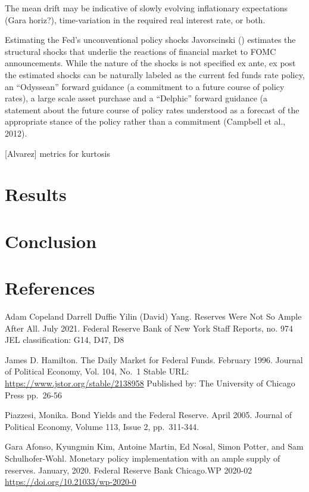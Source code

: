 \documentclass[
]{article}
\begin{document}
The mean drift may be indicative of slowly evolving inflationary expectations (Gara horiz?), time-variation in the required real interest rate, or both.

Estimating the Fed's unconventional policy shocks Javorscinski () estimates the structural shocks that underlie the reactions of financial market to FOMC announcements. While the nature of the shocks is not specified ex ante, ex post the estimated shocks can be naturally labeled as the current fed funds rate policy, an ``Odyssean'' forward guidance (a commitment to a future course of policy rates), a large scale asset purchase and a ``Delphic'' forward guidance (a statement about the future course of policy rates understood as a forecast of the appropriate stance of the policy rather than a commitment (Campbell et al., 2012).

{[}Alvarez{]} metrics for kurtosis

\hypertarget{results}{%
\section{Results}\label{results}}

\hypertarget{conclusion}{%
\section{Conclusion}\label{conclusion}}

\hypertarget{references}{%
\section{References}\label{references}}

Adam Copeland \textbar{} Darrell Duffie \textbar{} Yilin (David) Yang. Reserves Were Not So Ample After All. July 2021. Federal Reserve Bank of New York Staff Reports, no. 974
JEL classification: G14, D47, D8

James D. Hamilton. The Daily Market for Federal Funds. February 1996. Journal of Political Economy, Vol. 104, No.~1
Stable URL: \url{https://www.jstor.org/stable/2138958}
Published by: The University of Chicago Press pp.~26-56

Piazzesi, Monika. Bond Yields and the Federal Reserve. April 2005. Journal of Political Economy, Volume 113, Issue 2, pp.~311-344.

Gara Afonso, Kyungmin Kim, Antoine Martin, Ed Nosal, Simon Potter, and Sam Schulhofer-Wohl. Monetary policy implementation with an ample supply of reserves. January, 2020. Federal Reserve Bank Chicago.WP 2020-02
\url{https://doi.org/10.21033/wp-2020-0}
\end{document}
